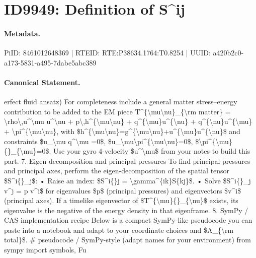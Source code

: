 \section*{ID9949: Definition of S\textasciicircum{}ij}
\paragraph{Metadata.}
PiID: 8461012648369 | RTEID: RTE:P38634.1764:T0.8254 | UUID: a420b2c0-a173-5831-a495-7dabe5abc389

\paragraph{Canonical Statement.}
erfect fluid ansatz) For completeness include a general matter stress–energy contribution to be added to the EM piece T\textasciicircum{}\{\textbackslash{}mu\textbackslash{}nu\}\_\{\textbackslash{}rm matter\} = \textbackslash{}rho\textbackslash{},u\textasciicircum{}\textbackslash{}mu u\textasciicircum{}\textbackslash{}nu + p\textbackslash{},h\textasciicircum{}\{\textbackslash{}mu\textbackslash{}nu\} + q\textasciicircum{}\{\textbackslash{}mu\}u\textasciicircum{}\{\textbackslash{}nu\} + q\textasciicircum{}\{\textbackslash{}nu\}u\textasciicircum{}\{\textbackslash{}mu\} + \textbackslash{}pi\textasciicircum{}\{\textbackslash{}mu\textbackslash{}nu\}, with \$h\textasciicircum{}\{\textbackslash{}mu\textbackslash{}nu\}=g\textasciicircum{}\{\textbackslash{}mu\textbackslash{}nu\}+u\textasciicircum{}\{\textbackslash{}mu\}u\textasciicircum{}\{\textbackslash{}nu\}\$ and constraints \$u\_\textbackslash{}mu q\textasciicircum{}\textbackslash{}mu =0\$, \$u\_\textbackslash{}mu\textbackslash{}pi\textasciicircum{}\{\textbackslash{}mu\textbackslash{}nu\}=0\$, \$\textbackslash{}pi\textasciicircum{}\{\textbackslash{}mu\}\{\}\_\{\textbackslash{}mu\}=0\$. Use your gyro 4-velocity \$u\textasciicircum{}\textbackslash{}mu\$ from your notes to build this part. 7. Eigen-decomposition and principal pressures To find principal pressures and principal axes, perform the eigen-decomposition of the spatial tensor \$S\textasciicircum{}i\{\}\_j\$: • Raise an index: \$S\textasciicircum{}i\{\}j = \textbackslash{}gamma\textasciicircum{}\{ik\}S\{kj\}\$. • Solve \$S\textasciicircum{}i\{\}\_j v\textasciicircum{}j = p v\textasciicircum{}i\$ for eigenvalues \$p\$ (principal pressures) and eigenvectors \$v\textasciicircum{}i\$ (principal axes). If a timelike eigenvector of \$T\textasciicircum{}\{\textbackslash{}mu\}\{\}\_\{\textbackslash{}nu\}\$ exists, its eigenvalue is the negative of the energy density in that eigenframe. 8. SymPy / CAS implementation recipe Below is a compact SymPy-like pseudocode you can paste into a notebook and adapt to your coordinate choices and \$A\_\{\textbackslash{}rm total\}\$. \# pseudocode / SymPy-style (adapt names for your environment) from sympy import symbols, Fu

